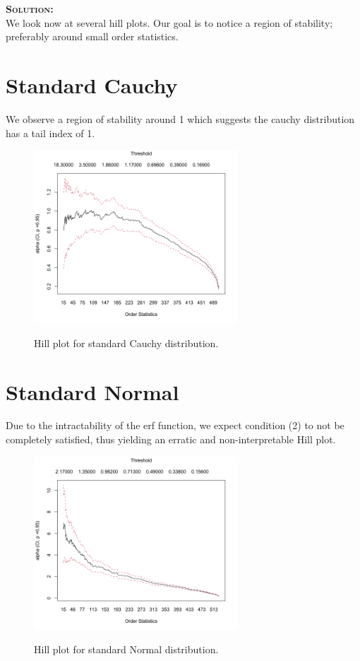 \documentclass[12pt,oneside]{article}
\newenvironment{solution}
    {\textbf{\textsc{Solution:}}\\}
    {\newpage}
\begin{document}
\begin{solution}
We look now at several hill plots. Our goal is to notice a region of stability; preferably around small order statistics.
\section{Standard Cauchy}

We observe a region of stability around 1 which suggests the cauchy distribution has a tail index of 1.
\begin{figure}[H]
\begin{center}
{\includegraphics[width=3in]{Assignments/a3/hill-plot-cauchy.png}}
\caption{Hill plot for standard Cauchy distribution.}
\end{center}
\end{figure}

\section{Standard Normal}
Due to the intractability of the erf function, we expect condition (2) to not be completely satisfied, thus yielding an erratic and non-interpretable Hill plot.
\begin{figure}[H]
\begin{center}
{\includegraphics[width=3in]{Assignments/a3/hill-plot-normal.png}}
\caption{Hill plot for standard Normal distribution.}
\end{center}
\end{figure}


\end{solution}
\end{document}
